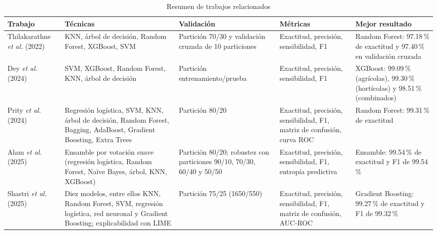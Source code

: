 \documentclass[conference]{IEEEtran}
\begin{document}
\begin{table}[htbp]
\caption{Resumen de trabajos relacionados}
\label{tab:sota}
\centering
\footnotesize
\begin{tabular}{>{\raggedright\arraybackslash}p{2.6cm}>{\raggedright\arraybackslash}p{4.1cm}>{\raggedright\arraybackslash}p{3.0cm}>{\raggedright\arraybackslash}p{3.0cm}>{\raggedright\arraybackslash}p{3.3cm}}
\toprule
\textbf{Trabajo} & \textbf{Técnicas} & \textbf{Validación} & \textbf{Métricas} & \textbf{Mejor resultado} \\
\midrule
Thilakarathne \emph{et al.} (2022) \cite{thilakarathne2022} & KNN, árbol de decisión, Random Forest, XGBoost, SVM & Partición 70/30 y validación cruzada de 10 particiones & Exactitud, precisión, sensibilidad, F1 & Random Forest: 97.18\,\% de exactitud y 97.40\,\% en validación cruzada \\
\midrule
Dey \emph{et al.} (2024) \cite{dey2024} & SVM, XGBoost, Random Forest, KNN, árbol de decisión & Partición entrenamiento/prueba & Exactitud, precisión, sensibilidad, F1 & XGBoost: 99.09\,\% (agrícolas), 99.30\,\% (hortícolas) y 98.51\,\% (combinados) \\
\midrule
Prity \emph{et al.} (2024) \cite{prity2024} & Regresión logística, SVM, KNN, árbol de decisión, Random Forest, Bagging, AdaBoost, Gradient Boosting, Extra Trees & Partición 80/20 & Exactitud, precisión, sensibilidad, F1, matriz de confusión, curva ROC & Random Forest: 99.31\,\% de exactitud \\
\midrule
Alam \emph{et al.} (2025) \cite{alam2025} & Ensamble por votación suave (regresión logística, Random Forest, Naïve Bayes, árbol, KNN, XGBoost) & Partición 80/20; robustez con particiones 90/10, 70/30, 60/40 y 50/50 & Exactitud, precisión, sensibilidad, F1, entropía predictiva & Ensamble: 99.54\,\% de exactitud y F1 de 99.54\,\% \\
\midrule
Shastri \emph{et al.} (2025) \cite{shastri2025} & Diez modelos, entre ellos KNN, Random Forest, SVM, regresión logística, red neuronal y Gradient Boosting; explicabilidad con LIME & Partición 75/25 (1650/550) & Exactitud, precisión, sensibilidad, F1, matriz de confusión, AUC-ROC & Gradient Boosting: 99.27\,\% de exactitud y F1 de 99.32\,\% \\
\bottomrule
\end{tabular}
\end{table}
\end{document}
